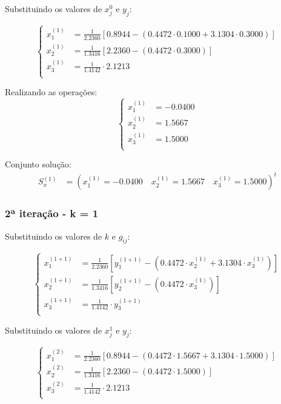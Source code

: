 \documentclass[12pt,a4paper]{article}
\begin{document}
Substituindo os valores de $x_j^{0}$ e $y_j$:

\[
\left\{
\begin{aligned}
x_1^{(1)} &= \frac{1}{2.2360} \left[ 0.8944 - \left(0.4472 \cdot 0.1000 + 3.1304 \cdot 0.3000\right) \right] \\
x_2^{(1)} &= \frac{1}{1.3416} \left[ 2.2360 - \left(0.4472 \cdot 0.3000\right) \right] \\
x_3^{(1)} &= \frac{1}{1.4142} \cdot 2.1213 \\
\end{aligned}
\right.
\]

Realizando as operações:
\[
\left\{
\begin{aligned}
x_1^{(1)} &= - 0.0400 \\
x_2^{(1)} &= 1.5667 \\
x_3^{(1)} &= 1.5000 \\
\end{aligned}
\right.
\]

Conjunto solução:
\begin{align*}
S_x^{(1)} &= ( x_1^{(1)} = -0.0400 \quad x_2^{(1)} = 1.5667 \quad x_3^{(1)} = 1.5000 )^{t}
\end{align*}

\subsubsection{2ª iteração - k = 1}

Substituindo os valores de $k$ e $g_{ij}$:

\[
\left\{
\begin{aligned}
x_1^{(1+1)} &= \frac{1}{2.2360} \left[ y_1^{(1+1)} - \left(0.4472 \cdot x_2^{(1)} + 3.1304 \cdot x_3^{(1)}\right) \right] \\
x_2^{(1+1)} &= \frac{1}{1.3416} \left[ y_2^{(1+1)} - \left(0.4472 \cdot x_3^{(1)}\right) \right] \\
x_3^{(1+1)} &= \frac{1}{1.4142} \cdot y_3^{(1+1)} \\
\end{aligned}
\right.
\]

Substituindo os valores de $x_j^{1}$ e $y_j$:

\[
\left\{
\begin{aligned}
x_1^{(2)} &= \frac{1}{2.2360} \left[ 0.8944 - \left(0.4472 \cdot 1.5667 + 3.1304 \cdot 1.5000\right) \right] \\
x_2^{(2)} &= \frac{1}{1.3416} \left[ 2.2360 - \left(0.4472 \cdot 1.5000\right) \right] \\
x_3^{(2)} &= \frac{1}{1.4142} \cdot 2.1213 \\
\end{aligned}
\right.
\]
\end{document}

